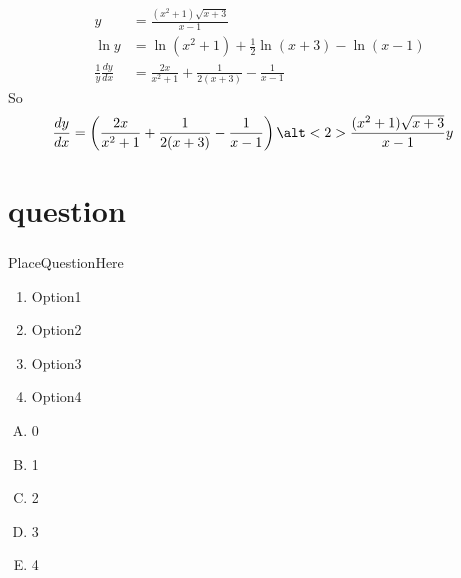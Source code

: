 \documentclass[xcolor=svgnames]{beamer}
\newcommand{\ft}[1]{\frametitle{#1}}
\begin{document}
\begin{frame}
\begin{align*}
y &= \frac{(x^2+1)\sqrt{x+3}}{x-1} \\
\ln y &= \ln (x^2+1) + \frac{1}{2} \ln(x+3) - \ln(x-1) \\
\frac{1}{y} \frac{dy}{dx}
      &= \frac{2x}{x^2+1} + \frac{1}{2(x+3)} - \frac{1}{x-1}
\end{align*}
So
\[
\begin{split}
\frac{dy}{dx} &= \left(\frac{2x}{x^2+1} + \frac{1}{2(x+3)} - \frac{1}{x-1}
\right)
\alt<2>{\frac{(x^2+1)\sqrt{x+3}}{x-1}}{y}
\end{split}
\]
\end{frame}

\section{question}





\begin{frame}[fragile]\ft{}
  \begin{example}
PlaceQuestionHere
\begin{enumerate}
\item {{Option1}}
\item {{Option2}}
\item {{Option3}}
\item {{Option4}} 
\end{enumerate}
\begin{multicols}{5}
\begin{enumerate}[A)]
\item 0 
\item 1
\item 2
\item 3
\item 4
\end{enumerate}
\end{multicols}
  \end{example} 
\end{frame}


\end{document}
